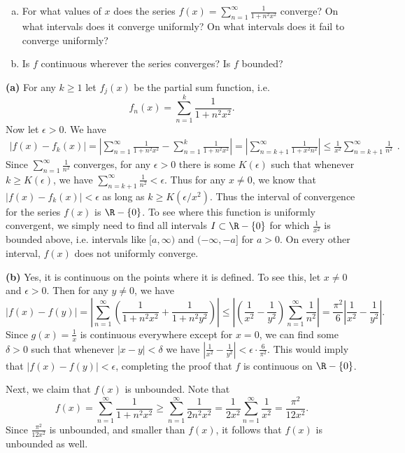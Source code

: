 \documentclass[11pt,letterpaper]{article}
\begin{document}
\begin{problem}\noindent
    \begin{enumerate}[(a)]
        \item For what values of $x$ does the series  $\displaystyle f(x)=\sum_{n=1}^\infty \frac{1}{1+n^2 x^2}$ converge? On what intervals does it converge uniformly? On what intervals does it fail to converge uniformly? 
        \item Is $f$ continuous wherever the series converges? Is $f$ bounded?
    \end{enumerate}
\end{problem}

\begin{solution}
    \textbf{(a)} For any $k\geq 1$ let $f_j(x)$ be the partial sum function, i.e.
    \[
        f_n(x)=\sum^k_{n=1}\frac{1}{1+n^2x^2}
    .\] 
    Now let $\epsilon > 0$. We have 
    \[
        \begin{aligned}
            \left|f(x)-f_k(x)\right|= \left|\sum^\infty_{n=1}\frac{1}{1+n^2x^2}-\sum^k_{n=1}\frac{1}{1+n^2x^2}\right|=\left|\sum^\infty_{n=k+1}\frac{1}{1+x^2n^2}\right|\leq \frac{1}{x^2}\sum^{\infty}_{n=k+1}\frac{1}{n^2}
        \end{aligned}
    .\] 
    Since $\sum^\infty_{n=1}\frac{1}{n^2}$ converges, for any $\epsilon>0$ there is some $K(\epsilon)$ such that whenever $k\geq K(\epsilon)$, we have $\sum^\infty_{n=k+1}\frac{1}{n^2}< \epsilon$. Thus for any $x\neq 0$, we know that $|f(x)-f_k(x)|<\epsilon$ as long as $k\geq K(\epsilon /x^2)$. Thus the interval of convergence for the series $f(x)$ is $\R-\{0\}$. To see where this function is uniformly convergent, we simply need to find all intervals $I\subset \R-\{0\}$ for which $\frac{1}{x^2}$ is bounded above, i.e. intervals like $[a,\infty)$ and $(-\infty,-a]$ for $a>0$. On every other interval, $f(x)$ does not uniformly converge.

    \textbf{(b)} Yes, it is continuous on the points where it is defined. To see this, let $x\neq 0$ and $\epsilon >0$. Then for any $y\neq 0$, we have
    \[
        |f(x)-f(y)| = \left|\sum^\infty_{n=1}\left(\frac{1}{1+n^2x^2}+\frac{1}{1+n^2y^2}\right)\right|\leq \left|\left(\frac{1}{x^2}-\frac{1}{y^2}\right)\sum^\infty_{n=1}\frac{1}{n^2}\right|=\frac{\pi^2}{6}\left|\frac{1}{x^2}-\frac{1}{y^2}\right|
    .\] 
    Since $g(x)=\frac{1}{x}$ is continuous everywhere except for $x=0$, we can find some $\delta>0$ such that whenever $|x-y|<\delta$ we have $\left|\frac{1}{x^2}-\frac{1}{y^2}\right|<\epsilon\cdot \frac{6}{\pi^2}$. This would imply that $|f(x)-f(y)|<\epsilon$, completing the proof that $f$ is continuous on $\R-\{0\}$. 

    Next, we claim that $f(x)$ is unbounded. Note that 
    \[
        f(x) = \sum^\infty_{n=1}\frac{1}{1+n^2x^2} \geq \sum^\infty_{n=1}\frac{1}{2n^2x^2} =\frac{1}{2x^2}\sum^\infty_{n=1}\frac{1}{x^2}=\frac{\pi^2}{12x^2}
    .\]  
    Since $\frac{\pi^2}{12x^2}$ is unbounded, and smaller than $f(x)$, it follows that $f(x)$ is unbounded as well.
\end{solution}
\end{document}

